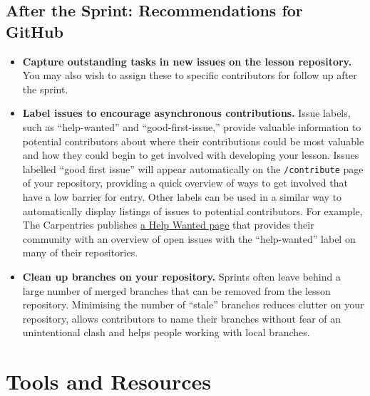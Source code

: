 \documentclass[
]{book}
\begin{document}
\hypertarget{after-the-sprint-recommendations-for-github}{%
\subsection{After the Sprint: Recommendations for GitHub}\label{after-the-sprint-recommendations-for-github}}

\begin{itemize}
\item
  \textbf{Capture outstanding tasks in new issues on the lesson repository.}
  You may also wish to assign these to specific contributors for follow up after the sprint.
\item
  \textbf{Label issues to encourage asynchronous contributions.}
  Issue labels, such as ``help-wanted'' and ``good-first-issue,'' provide valuable information to potential contributors
  about where their contributions could be most valuable and how they could begin to get involved with developing
  your lesson.
  Issues labelled ``good first issue'' will appear automatically on the \texttt{/contribute} page of your repository,
  providing a quick overview of ways to get involved that have a low barrier for entry.
  Other labels can be used in a similar way to automatically display listings of issues to potential contributors.
  For example, The Carpentries publishes \href{https://carpentries.org/help-wanted-issues/}{a Help Wanted page} that provides their community with an overview of
  open issues with the ``help-wanted'' label on many of their repositories.
\item
  \textbf{Clean up branches on your repository.}
  Sprints often leave behind a large number of merged branches that can be removed from the lesson repository.
  Minimising the number of ``stale'' branches reduces clutter on your repository, allows contributors to name their branches without fear of an unintentional clash
  and helps people working with local branches.
\end{itemize}

\hypertarget{tools-and-resources}{%
\section{Tools and Resources}\label{tools-and-resources}}
\end{document}
